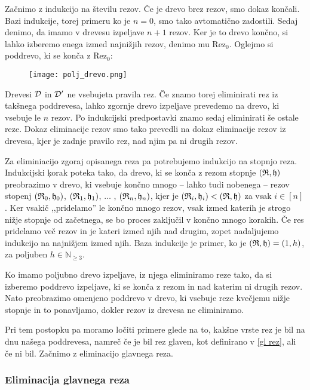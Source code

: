 Začnimo z indukcijo na številu rezov. Če je drevo brez rezov, smo dokaz končali. Bazi indukcije, torej primeru ko je $n=0$, smo tako avtomatično zadostili. Sedaj denimo, da imamo v drevesu izpeljave $n+1$ rezov. Ker je to drevo končno, si lahko izberemo enega izmed najnižjih rezov, denimo mu Rez$_0$. Oglejmo si poddrevo, ki se konča z Rez$_0$:
\begin{figure}[h]
    \centering \texttt{[image: polj\_drevo.png]}
\end{figure}

Drevesi $\mathcal{D}$ in $\mathcal{D}'$ ne vsebujeta pravila rez. Če znamo torej eliminirati rez iz takšnega poddrevesa, lahko zgornje drevo izpeljave prevedemo na drevo, ki vsebuje le $n$ rezov. Po indukcijski predpostavki znamo sedaj eliminirati še ostale reze. Dokaz eliminacije rezov smo tako prevedli na dokaz eliminacije rezov iz drevesa, kjer je zadnje pravilo rez, nad njim pa ni drugih rezov.

Za eliminiacijo zgoraj opisanega reza pa potrebujemo indukcijo na stopnjo reza. Indukcijski ķorak poteka tako, da drevo, ki se konča z rezom stopnje $(\mathfrak{R},\mathfrak{h})$ preobrazimo v drevo, ki vsebuje končno mnogo -- lahko tudi nobenega -- rezov stopenj $(\mathfrak{R}_0,\mathfrak{h}_0)$, $(\mathfrak{R}_1,\mathfrak{h}_1)$, $\ldots$ , $(\mathfrak{R}_n,\mathfrak{h}_n)$, kjer je $(\mathfrak{R}_i,\mathfrak{h}_i) < (\mathfrak{R},\mathfrak{h})$ za vsak $i\in[n]$. Ker vsakič ,,pridelamo'' le končno mnogo rezov, vsak izmed katerih je strogo nižje stopnje od začetnega, se bo proces zaključil v končno mnogo korakih. Če res pridelamo več rezov in je kateri izmed njih nad drugim, zopet nadaljujemo indukcijo na najnižjem izmed njih. Baza indukcije je primer, ko je $(\mathfrak{R},\mathfrak{h}) = (1,h)$, za poljuben $h\in\mathbb{N}_{\geq3}$.

\begin{summary}
    Ko imamo poljubno drevo izpeljave, iz njega eliminiramo reze tako, da si izberemo poddrevo izpeljave, ki se konča z rezom in nad katerim ni drugih rezov. Nato preobrazimo omenjeno poddrevo v drevo, ki vsebuje reze kvečjemu nižje stopnje in to ponavljamo, dokler rezov iz drevesa ne eliminiramo.
\end{summary}

Pri tem postopku pa moramo ločiti primere glede na to, kakšne vrste rez je bil na dnu našega poddrevesa, namreč če je bil rez glaven, kot definirano v \ref{gl rez}, ali če ni bil. Začnimo z eliminacijo glavnega reza.

\subsubsection{Eliminacija glavnega reza} \label{gl rez vezniki}


